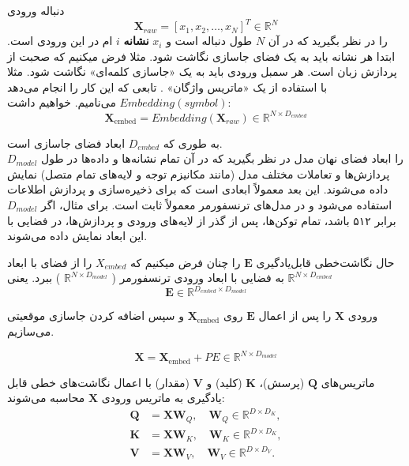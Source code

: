 
دنباله ورودی
$$\mathbf{X}_{raw} = [x_1, x_2, \dots, x_N]^T \in \mathbb{R}^{N}$$
را در نظر بگیرید که در آن $N$ طول دنباله است و $ x_i $
\textbf{نشانه}
$i$
ام در این ورودی است. ابتدا هر نشانه باید به یک فضای جاسازی نگاشت شود. مثلا فرض میکنیم که صحبت از پردازش زبان است. هر سمبل ورودی باید به یک «جاسازی کلمه‌ای»%
نگاشت شود. مثلا با استفاده از یک «ماتریس واژگان»%
.
تابعی که این کار را انجام می‌دهد $ Embedding(symbol) $ می‌نامیم. خواهیم داشت:
 $$
 \mathbf{X}_{\text{embed}} = Embedding(\mathbf{X}_{raw}) \in \mathbb{R}^{N \times D_{embed}}
 $$ 

به طوری که $ D_{embed} $ ابعاد فضای جاسازی است.\\
$ D_{model} $
را ابعاد فضای نهان مدل در نظر بگیرید که در آن تمام نشانه‌ها و داده‌ها در طول پردازش‌ها و تعاملات مختلف مدل (مانند مکانیزم توجه و لایه‌های تمام متصل) نمایش داده می‌شوند. این بعد معمولاً ابعادی است که برای ذخیره‌سازی و پردازش اطلاعات استفاده می‌شود و در مدل‌های ترنسفورمر معمولاً ثابت است. برای مثال، اگر $ D_{model}$ برابر ۵۱۲ باشد، تمام توکن‌ها، پس از گذر از لایه‌های ورودی و پردازش‌ها، در فضایی با این ابعاد نمایش داده می‌شوند.

حال نگاشت‌خطی قابل‌یادگیری $ \mathbf{E} $ را چنان فرض میکنیم که $ X_{embed} $ را از فضای با ابعاد
$\mathbb{R}^{N \times D_{embed}}$
به فضایی با ابعاد ورودی ترنسفورمر (
$\mathbb{R}^{N \times D_{model}}$
) ببرد. یعنی
$$
	\mathbf{E} \in \mathbb{R}^{D_{embed} \times D_{model}}
$$

ورودی $ \mathbf{X} $ را پس از اعمال $\mathbf{E} $ روی $ \mathbf{X}_{\text{embed}} $ و سپس اضافه کردن جاسازی موقعیتی می‌سازیم.

\begin{equation}
	\mathbf{X} = \mathbf{X}_{\text{embed}} + PE \in \mathbb{R}^{N \times D_{model}}
\end{equation}



ماتریس‌های $\mathbf{Q}$ (پرسش)، $\mathbf{K}$ (کلید) و $\mathbf{V}$ (مقدار) با اعمال نگاشت‌های خطی قابل یادگیری به ماتریس ورودی $\mathbf{X}$ محاسبه می‌شوند:
\begin{align*}
	\mathbf{Q} &= \mathbf{X} \mathbf{W}_Q, \quad \mathbf{W}_Q \in \mathbb{R}^{D \times D_K}, \\
	\mathbf{K} &= \mathbf{X} \mathbf{W}_K, \quad \mathbf{W}_K \in \mathbb{R}^{D \times D_K}, \\
	\mathbf{V} &= \mathbf{X} \mathbf{W}_V, \quad \mathbf{W}_V \in \mathbb{R}^{D \times D_V}.
\end{align*}


